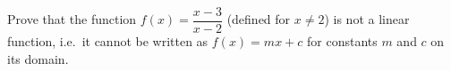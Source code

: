 Prove that the function $f(x)=\dfrac{x-3}{x-2}$ (defined for $x\ne2$) is not a linear function, i.e.\ it cannot be written as $f(x)=mx+c$ for constants $m$ and $c$ on its domain.
